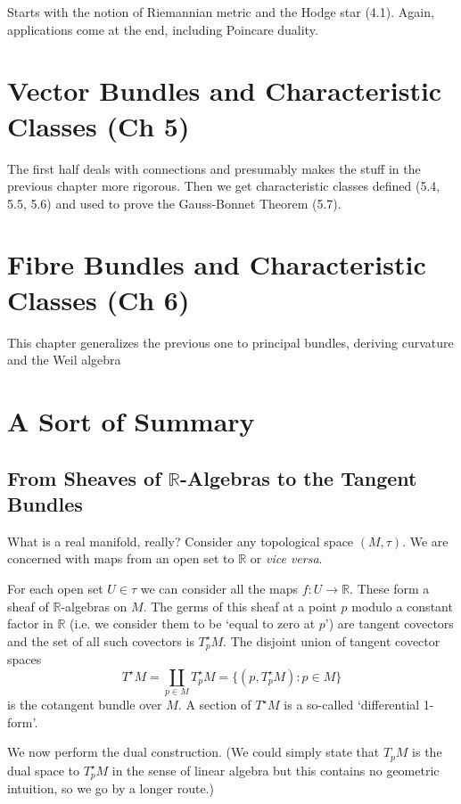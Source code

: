 \documentclass[oneside,english]{amsbook}
\numberwithin{section}{chapter}
\theoremstyle{plain}
\theoremstyle{definition}
\begin{document}
Starts with the notion of Riemannian metric and the Hodge star (4.1). Again, applications come at the end, including Poincare duality.

\section{Vector Bundles and Characteristic Classes (Ch 5)}

The first half deals with connections and presumably makes the stuff in the previous chapter more rigorous. Then we get characteristic classes defined (5.4, 5.5, 5.6) and used to prove the Gauss-Bonnet Theorem (5.7).

\section{Fibre Bundles and Characteristic Classes (Ch 6)}

This chapter generalizes the previous one to principal bundles, deriving curvature and the Weil algebra

\section{A Sort of Summary}

\subsection{From Sheaves of $\mathbb{R}$-Algebras to the Tangent Bundles}

What is a real manifold, really? Consider any topological space $(M, \tau)$. We are concerned with maps from an open set to $\mathbb{R}$ or \emph{vice versa}.

For each open set $U\in\tau$ we can consider all the maps  $f:U\to\mathbb{R}$. These form a sheaf of $\mathbb{R}$-algebras on $M$. The germs of this sheaf at a point $p$ modulo a constant factor in $\mathbb{R}$ (i.e. we consider them to be `equal to zero at $p$') are tangent covectors and the set of all such covectors is $T^\star_pM$. The disjoint union of tangent covector spaces
\[
	T^\star M = \coprod_{p\in M}T^\star_pM = \{(p, T^\star_pM) : p\in M\}
\]
is the cotangent bundle over $M$. A section of $T^\star M$ is a so-called `differential 1-form'.

We now perform the dual construction. (We could simply state that $T_pM$ is the dual space to $T^\star_pM$ in the sense of linear algebra but this contains no geometric intuition, so we go by a longer route.)
\end{document}
